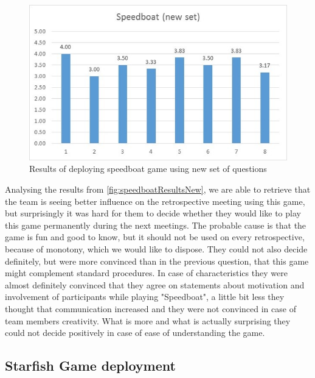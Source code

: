 \begin{figure}[!htbp]
\caption{Results of deploying speedboat game using new set of questions}
\label{fig:speedboatResultsNew}
\centering
\includegraphics[width=1\textwidth]{charts/speedboatNewSet}
\end{figure}

Analysing the results from \autoref{fig:speedboatResultsNew}, we are able to retrieve that the team is seeing better influence on the retrospective meeting using this game, but surprisingly it was hard for them to decide whether they would like to play this game permanently during the next meetings. The probable cause is that the game is fun and good to know, but it should not be used on every retrospective, because of monotony, which we would like to dispose. They could not also decide definitely, but were more convinced than in the previous question, that this game might complement standard procedures. In case of characteristics they were almost definitely convinced that they agree on statements about motivation and involvement of participants while playing "Speedboat", a little bit less they thought that communication increased and they were not convinced in case of team members creativity. What is more and what is actually surprising they could not decide positively in case of ease of understanding the game. 
\subsection{Starfish Game deployment}

